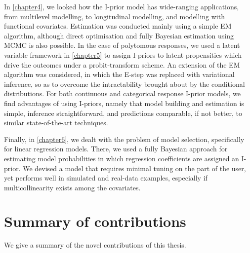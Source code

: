 \documentclass[showframe,11pt,twoside,openright]{report}
\begin{document}
In \cref{chapter4}, we looked how the I-prior model has wide-ranging applications, from multilevel modelling, to longitudinal modelling, and modelling with functional covariates.
Estimation was conducted mainly using a simple EM algorithm, although direct optimisation and fully Bayesian estimation using MCMC is also possible.
In the case of polytomous responses, we used a latent variable framework in \cref{chapter5} to assign I-priors to latent propensities which drive the outcomes under a probit-transform scheme. 
An extension of the EM algorithm was considered, in which the E-step was replaced with variational inference, so as to overcome the intractability brought about by the conditional distributions.
For both continuous and categorical response I-prior models, we find advantages of using I-priors, namely that model building and estimation is simple, inference  straightforward, and predictions comparable, if not better, to similar state-of-the-art techniques.

Finally, in \cref{chapter6}, we dealt with the problem of model selection, specifically for linear regression models.
There, we used a fully Bayesian approach for estimating model probabilities in which  regression coefficients are assigned an I-prior.
We devised a model that requires minimal tuning on the part of the user, yet performs well in simulated and real-data examples, especially if multicollinearity exists among the covariates.


\section{Summary of contributions}

We give a summary of the novel contributions of this thesis.
\end{document}
